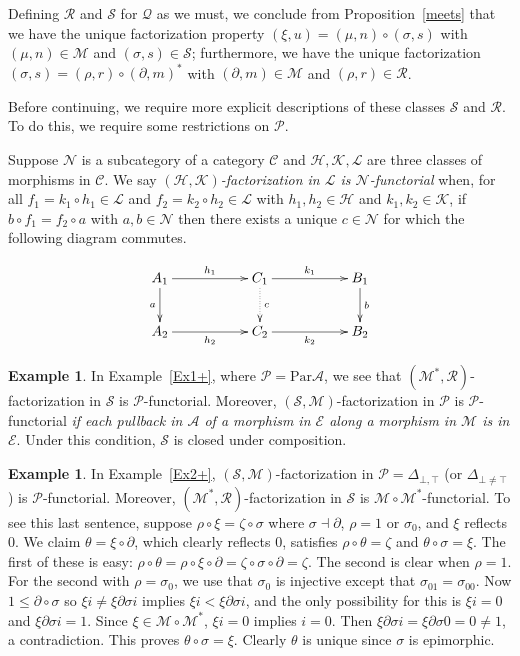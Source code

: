 \documentclass[a4paper,12pt,reqno]{amsart}
\theoremstyle{definition}
\newtheorem{example}[theorem]{Example}
\theoremstyle{fact}
\theoremstyle{genquest}
\theoremstyle{step}
\def\CA{{\mathscr A}}
\def\CC{{\mathscr C}}
\def\CE{{\mathscr E}}
\def\CH{{\mathscr H}}
\def\CK{{\mathscr K}}
\def\CL{{\mathscr L}}
\def\CM{{\mathscr M}}
\def\CN{{\mathscr N}}
\def\CP{{\mathscr P}}
\def\CQ{{\mathscr Q}}
\def\CR{{\mathscr R}}
\def\CS{{\mathscr S}}
\begin{document}
Defining $\CR$ and $\CS$ for $\CQ$ as we must, we conclude from 
Proposition~\ref{meets} that we have the unique factorization property 
$(\xi,u) = (\mu , n)\circ (\sigma, s)$ with $(\mu, n)\in \CM$ and
$(\sigma, s) \in \CS$; furthermore, we have the unique factorization
$(\sigma, s) = (\rho, r)\circ (\partial , m)^*$ with
$(\partial, m)\in \CM$ and $(\rho, r) \in \CR$.  

Before continuing, we require more explicit descriptions of these classes $\CS$ and $\CR$.
To do this, we require some restrictions on $\CP$. 

Suppose $\CN$ is a subcategory of a category $\CC$ and $\CH , \CK, \CL$ 
are three classes of morphisms in $\CC$. 
We say $(\CH , \CK)${\em-factorization in $\CL$ is $\CN$-functorial} when, 
for all $f_1 = k_1\circ h_1 \in \CL$ and $f_2=k_2 \circ h_2 \in \CL$ with $h_1, h_2 \in \CH$ and $k_1, k_2\in \CK$, if $b\circ f_1=f_2 \circ a$ with $a, b\in \CN$ then there exists a unique $c\in \CN$ for which the following diagram commutes. 

\begin{eqnarray*}
\xymatrix{
A_1 \ar[rr]^-{h_1} \ar[d]_-{a} && C_1 \ar[rr]^-{k_1} \ar@{.>}[d]^-{c} && B_1 \ar[d]^-{b} \\
A_2 \ar[rr]_-{h_2} && C_2 \ar[rr]_-{k_2}  && B_2
} 
\end{eqnarray*}
 
  \begin{example}\label{essalongem}
 In Example~\ref{Ex1+}, where $\CP=\mathrm{Par}\CA$, we see that 
 $(\CM^*,\CR)$-factorization in $\CS$ is $\CP$-functorial. 
 Moreover, $(\CS,\CM)$-factorization in $\CP$ is $\CP$-functorial  
 {\em if each pullback in $\CA$ of a morphism in $\CE$ along a morphism in 
 $\CM$ is in $\CE$}. Under this condition, $\CS$ is closed under composition.   
 \end{example}

 \begin{example}
 In Example~\ref{Ex2+}, $(\CS,\CM)$-factorization in $\CP=\Delta_{\bot, \top}$ (or $\Delta_{\bot \ne \top}$) is $\CP$-functorial.
 Moreover, $(\CM^*,\CR)$-factorization in $\CS$ is $\CM\circ \CM^*$-functorial. 
 To see this last sentence, suppose $\rho \circ \xi = \zeta \circ \sigma$ 
 where $\sigma \dashv \partial$, $\rho = 1 \text{ or } \sigma_0$, and 
 $\xi$ reflects $0$. We claim $\theta = \xi \circ \partial$, which clearly reflects $0$, 
 satisfies $\rho \circ \theta = \zeta$ and $\theta \circ \sigma = \xi$.
 The first of these is easy: $\rho \circ \theta = \rho \circ \xi \circ \partial
 = \zeta \circ \sigma \circ \partial = \zeta$.
 The second is clear when $\rho = 1$. 
 For the second with $\rho = \sigma_0$, we use that $\sigma_0$ is injective 
 except that $\sigma_01=\sigma_00$. 
 Now $1\le \partial \circ \sigma$ so $\xi i \ne \xi \partial \sigma i$ implies
 $\xi i < \xi \partial \sigma i$, and the only possibility for this is $\xi i = 0$ and
 $\xi \partial \sigma i = 1$. Since $\xi \in \CM\circ \CM^*$, $\xi i = 0$ implies
 $i=0$. Then $\xi \partial \sigma i = \xi \partial \sigma 0 = 0 \ne 1$,
 a contradiction. This proves $\theta \circ \sigma = \xi$. 
 Clearly $\theta$ is unique since $\sigma$ is epimorphic.    
 \end{example}
  
\end{document}
